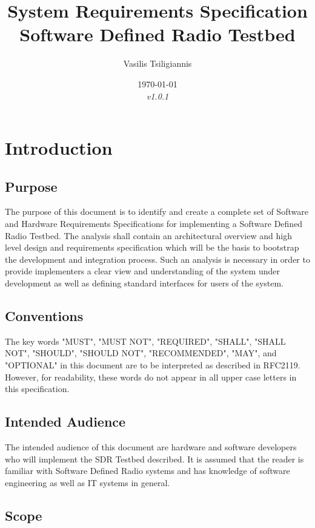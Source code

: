 \documentclass[english,titlepage,a4paper]{report}
\title{
  System Requirements Specification \\
  \large Software Defined Radio Testbed
}
\author{Vasilis Tsiligiannis}
\date{\today\\\textit{v1.0.1}}
\begin{document}
\renewcommand*{\arraystretch}{2}
\maketitle
\tableofcontents


\chapter{Introduction}
\section{Purpose}

The purpose of this document is to identify and create a complete set of Software and Hardware Requirements Specifications for implementing a Software Defined Radio Testbed.
The analysis shall contain an architectural overview and high level design and requirements specification which will be the basis to bootstrap the development and integration process.
Such an analysis is necessary in order to provide implementers a clear view and understanding of the system under development as well as defining standard interfaces for users of the system.

\section{Conventions}

The key words "MUST", "MUST NOT", "REQUIRED", "SHALL", "SHALL NOT", "SHOULD", "SHOULD NOT", "RECOMMENDED", "MAY", and "OPTIONAL" in this document are to be interpreted as described in \gls{RFC2119}.
However, for readability, these words do not appear in all upper case letters in this specification.

\newpage
\printglossary[type=definitions,numberedsection,style=definitions,nonumberlist]

\section{Intended Audience}

The intended audience of this document are hardware and software developers who will implement the \gls{SDR Testbed} described.
It is assumed that the reader is familiar with Software Defined Radio systems and has knowledge of software engineering as well as IT systems in general.

\section{Scope}
\end{document}
